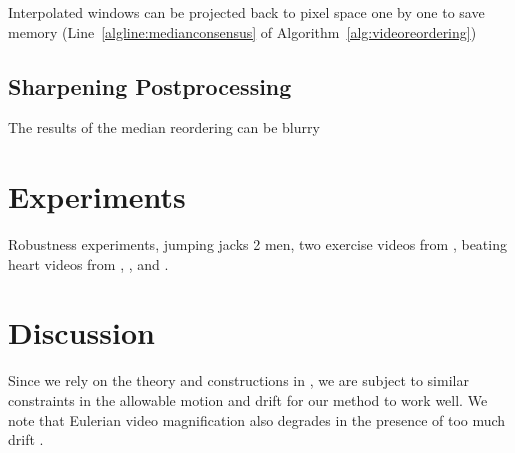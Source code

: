 \documentclass{article}
\begin{document}
Interpolated windows can be projected back to pixel space one by one to save memory (Line~\ref{algline:medianconsensus} of Algorithm~\ref{alg:videoreordering})

\subsection{Sharpening Postprocessing}

The results of the median reordering can be blurry


\section{Experiments}

Robustness experiments, jumping jacks 2 men, two exercise videos from \cite{levy2015live}, beating heart videos from \cite{traliehigh}, \cite{wu2012eulerian}, and \cite{wadhwa2013phase}.


\section{Discussion}

Since we rely on the theory and constructions in \cite{tralie2017quasi}, we are subject to similar constraints in the allowable motion and drift for our method to work well.  We note that Eulerian video magnification also degrades in the presence of too much drift \cite{wu2012eulerian, wadhwa2013phase}.




\end{document}
